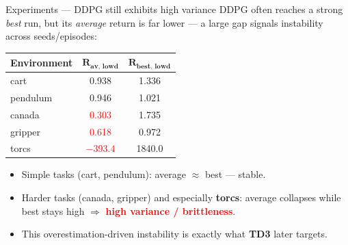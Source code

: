 \begin{frame}{Experiments --- DDPG still exhibits high variance}
\vspace{0.3em}
DDPG often reaches a strong \emph{best} run, but its \emph{average} return is far lower --- a large gap signals instability across seeds/episodes:
\vspace{0.6em}
\begin{center}
\renewcommand{\arraystretch}{1.3}
\small
\begin{tabular}{lcc}
\hline
\textbf{Environment} & $\boldsymbol{R_{av,\,lowd}}$ & $\boldsymbol{R_{best,\,lowd}}$ \\
\hline
cart      & 0.938   & 1.336 \\
pendulum  & 0.946   & 1.021 \\
canada    & \textcolor{red}{0.303}   & 1.735 \\
gripper   & \textcolor{red}{0.618}   & 0.972 \\
torcs     & \textcolor{red}{$-393.4$} & 1840.0 \\
\hline
\end{tabular}
\end{center}
\vspace{0.5em}
\footnotesize
\begin{itemize}
    \item Simple tasks (cart, pendulum): average $\approx$ best --- stable.
    \item Harder tasks (canada, gripper) and especially \textbf{torcs}: average collapses while best stays high $\Rightarrow$ \textcolor{red}{\textbf{high variance / brittleness}}.
    \item This overestimation-driven instability is exactly what \textbf{TD3} later targets.
\end{itemize}
\end{frame}
